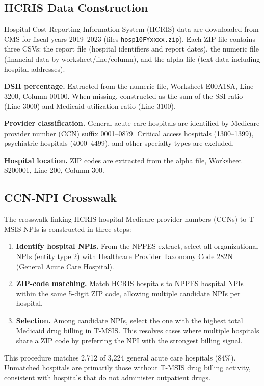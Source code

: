 \documentclass[12pt]{article}
\begin{document}
\subsection{HCRIS Data Construction}

Hospital Cost Reporting Information System (HCRIS) data are downloaded from CMS for fiscal years 2019--2023 (files \texttt{hosp10FYxxxx.zip}). Each ZIP file contains three CSVs: the report file (hospital identifiers and report dates), the numeric file (financial data by worksheet/line/column), and the alpha file (text data including hospital addresses).

\textbf{DSH percentage.} Extracted from the numeric file, Worksheet E00A18A, Line 3200, Column 00100. When missing, constructed as the sum of the SSI ratio (Line 3000) and Medicaid utilization ratio (Line 3100).

\textbf{Provider classification.} General acute care hospitals are identified by Medicare provider number (CCN) suffix 0001--0879. Critical access hospitals (1300--1399), psychiatric hospitals (4000--4499), and other specialty types are excluded.

\textbf{Hospital location.} ZIP codes are extracted from the alpha file, Worksheet S200001, Line 200, Column 300.

\subsection{CCN-NPI Crosswalk}

The crosswalk linking HCRIS hospital Medicare provider numbers (CCNs) to T-MSIS NPIs is constructed in three steps:

\begin{enumerate}
\item \textbf{Identify hospital NPIs.} From the NPPES extract, select all organizational NPIs (entity type 2) with Healthcare Provider Taxonomy Code 282N (General Acute Care Hospital).
\item \textbf{ZIP-code matching.} Match HCRIS hospitals to NPPES hospital NPIs within the same 5-digit ZIP code, allowing multiple candidate NPIs per hospital.
\item \textbf{Selection.} Among candidate NPIs, select the one with the highest total Medicaid drug billing in T-MSIS. This resolves cases where multiple hospitals share a ZIP code by preferring the NPI with the strongest billing signal.
\end{enumerate}

This procedure matches 2,712 of 3,224 general acute care hospitals (84\%). Unmatched hospitals are primarily those without T-MSIS drug billing activity, consistent with hospitals that do not administer outpatient drugs.
\end{document}

